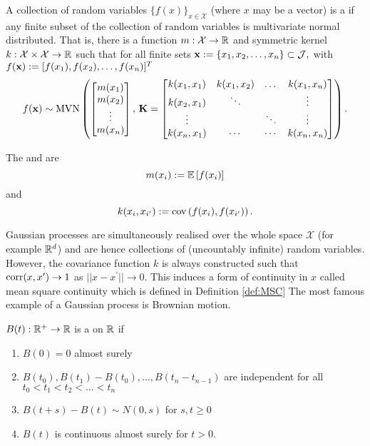\begin{definition}\label{def:gp}
    A collection of random variables $\{f(x)\}_{x\in\mathcal{X}}$
    (where $x$ may be a vector) is a  if any finite
    subset of the collection of random variables is multivariate normal
    distributed. That is, there is a function $m:\mathcal{X}\to\mathbb{R}$ and
    symmetric kernel $k:\mathcal{X}\times\mathcal{X}\to \mathbb{R}$ such that for all
    finite sets
    $\mathbf{x} :=\{x_1, x_2, \dots, x_n\} \subset \mathcal{J},$ with
    $f(\mathbf{x}) := [f(x_1), f(x_2), \dots, f(x_n)]^T$
    $$f(\mathbf{x}) \sim
        \operatorname{MVN}\left(\begin{bmatrix}
            m(x_1) \\ m(x_2)\\ \vdots\\ m(x_n)
        \end{bmatrix},\, \mathbf{K} = \begin{bmatrix}
            k(x_1, x_1) & k(x_1, x_2) & \dots  & k(x_1, x_n) \\
            k(x_2, x_1) & \ddots      &        & \vdots      \\
            \vdots      &             & \ddots & \vdots      \\
            k(x_n, x_1) & \cdots      & \cdots & k(x_n, x_n)
        \end{bmatrix}\right).$$
\end{definition}

\begin{definition}\label{def:mean_kernel}
    The  and  are
    $$m(x_i) := \operatorname{\mathbb{E}}\left[f(x_i)\right]$$ and
    $$k(x_{i}, x_{i^\prime}) := \operatorname{cov}\left(f(x_i), f(x_{i^\prime})\right).$$
\end{definition}

Gaussian processes are simultaneously realised over the whole space
$\mathcal{X}$ (for example $\mathbb{R}^d$) and are hence collections of
(uncountably infinite)
random variables. However, the covariance function $k$ is always constructed
such that
$\operatorname{corr}(x, x^\prime) \to 1$ as $||x - x^\prime||\to 0.$
This induces a form of continuity in $x$ called mean square continuity which
is defined in Definition \ref{def:MSC}
The most famous example of a Gaussian process is Brownian motion.

\begin{definition}
    $B(t):\mathbb{R}^+ \to \mathbb{R}$ is a  on $\mathbb{R}$ if\begin{enumerate}
        \item $B(0) = 0$ almost surely
        \item $B(t_0), B(t_1) - B(t_0), \dots, B(t_n - t_{n-1})$ are
              independent for all $t_0<t_1<t_2<\dots<t_n$
        \item $B(t + s) - B(t)\sim N(0, s)$ for $s, t \geq 0$
        \item $B(t)$ is continuous almost surely for $t>0.$
    \end{enumerate}
\end{definition}

